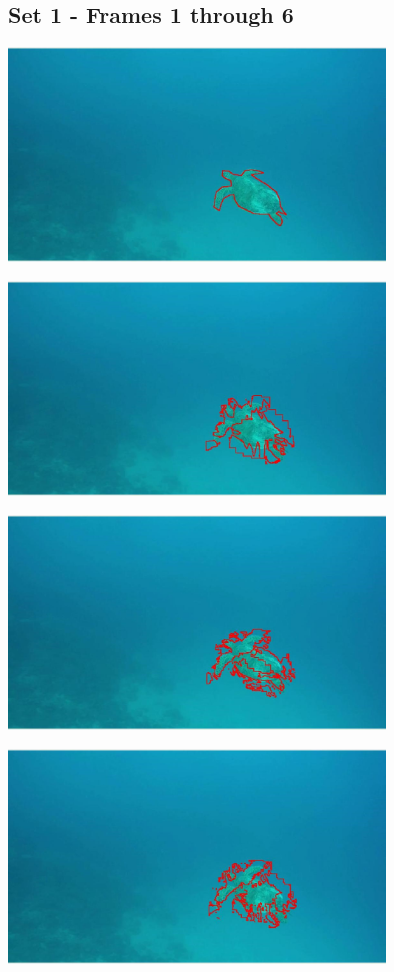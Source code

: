 \documentclass{article}
\begin{document}
	\subsection{Set 1 - Frames 1 through 6}
	
	\begin{center}
		\includegraphics[width=100mm]{img/a1}
	\end{center}

	\begin{center}
		\includegraphics[width=100mm]{img/a2}
	\end{center}

	\begin{center}
		\includegraphics[width=100mm]{img/a3}
	\end{center}

	\begin{center}
		\includegraphics[width=100mm]{img/a4}
	\end{center}
\end{document}
